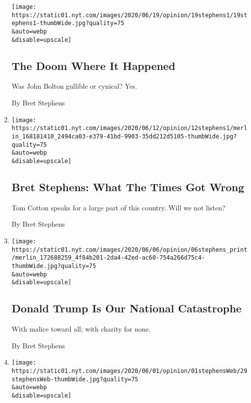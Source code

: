 \begin{enumerate}
  \texttt{[image: https://static01.nyt.com/images/2020/06/19/opinion/19stephens1/19stephens1-thumbWide.jpg?quality=75\\\&auto=webp\\\&disable=upscale]}

  \hypertarget{the-doom-where-it-happened}{%
  \subsection{The Doom Where It
  Happened}\label{the-doom-where-it-happened}}

  Was John Bolton gullible or cynical? Yes.

  By Bret Stephens
\item
  \href{/2020/06/12/opinion/tom-cotton-op-ed.html}{}

  \texttt{[image: https://static01.nyt.com/images/2020/06/12/opinion/12stephens1/merlin\_168181410\_2494ca03-e379-41bd-9903-35dd212d5105-thumbWide.jpg?quality=75\\\&auto=webp\\\&disable=upscale]}

  \hypertarget{bret-stephens-what-the-times-got-wrong}{%
  \subsection{Bret Stephens: What The Times Got
  Wrong}\label{bret-stephens-what-the-times-got-wrong}}

  Tom Cotton speaks for a large part of this country. Will we not
  listen?

  By Bret Stephens
\item
  \href{/2020/06/05/opinion/donald-trump.html}{}

  \texttt{[image: https://static01.nyt.com/images/2020/06/06/opinion/06stephens\_print/merlin\_172688259\_4f84b201-2da4-42ed-ac60-754a266d75c4-thumbWide.jpg?quality=75\\\&auto=webp\\\&disable=upscale]}

  \hypertarget{donald-trump-is-our-national-catastrophe}{%
  \subsection{Donald Trump Is Our National
  Catastrophe}\label{donald-trump-is-our-national-catastrophe}}

  With malice toward all; with charity for none.

  By Bret Stephens
\item
  \href{/2020/05/29/opinion/china-hong-kong.html}{}

  \texttt{[image: https://static01.nyt.com/images/2020/06/01/opinion/01stephensWeb/29stephensWeb-thumbWide.jpg?quality=75\\\&auto=webp\\\&disable=upscale]}


\end{enumerate}
